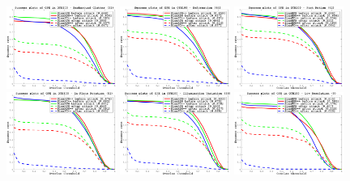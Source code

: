 \documentclass[journal]{IEEEtran}
\begin{document}
\begin{figure}[t!]
  \begin{center}
    \includegraphics[width=0.32\textwidth]{images_imperceptible/OTB2015/success_plot_OPE_OTB100_BC.png}
    \includegraphics[width=0.32\textwidth]{images_imperceptible/OTB2015/success_plot_OPE_OTB100_DEF.png}
    \includegraphics[width=0.32\textwidth]{images_imperceptible/OTB2015/success_plot_OPE_OTB100_FM.png}
    \includegraphics[width=0.32\textwidth]{images_imperceptible/OTB2015/success_plot_OPE_OTB100_IPR.png}
    \includegraphics[width=0.32\textwidth]{images_imperceptible/OTB2015/success_plot_OPE_OTB100_IV.png}
    \includegraphics[width=0.32\textwidth]{images_imperceptible/OTB2015/success_plot_OPE_OTB100_LR.png}

\end{center}
\end{figure}
\end{document}
